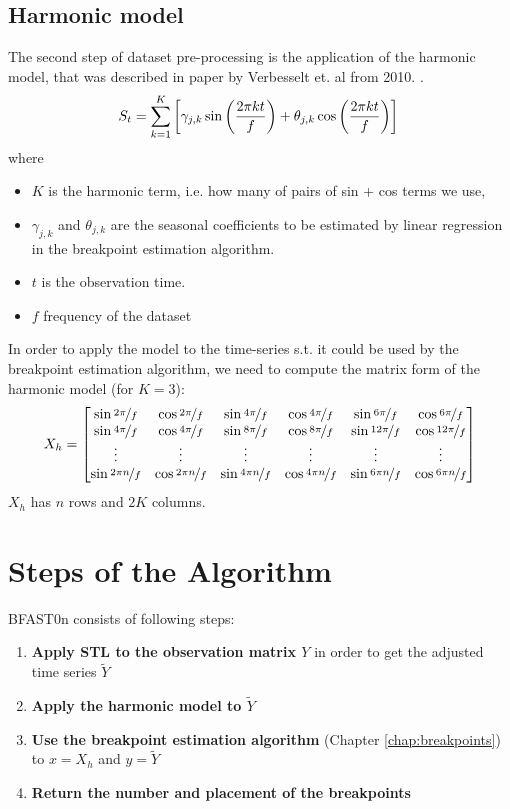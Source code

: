\documentclass[main.tex]{subfiles}
\begin{document}
\subsection{Harmonic model}
\label{subsec:harmonic_model}
The second step of dataset pre-processing is the application of the harmonic
model, that was described in paper by Verbesselt et. al from 2010.
\cite{bfast1}.
\[
S_{t} =
\sum_{k=1}^{K}\left[\gamma_{j, k} \sin \left(\frac{2 \pi k t}{f}\right)+
  \theta_{j, k} \cos \left(\frac{2 \pi k t}{f}\right)\right]\\
\]
where
\begin{itemize}
\item $K$ is the harmonic term, i.e. how many of pairs of sin + cos terms we use,
\item $\gamma_{j, k}$ and $\theta_{j, k}$ are the seasonal coefficients to be
  estimated by linear regression in the breakpoint estimation algorithm.
\item $t$ is the observation time.
\item $f$ frequency of the dataset
\end{itemize}
In order to apply the model to the time-series s.t. it could be used by the
breakpoint estimation algorithm, we need to compute the matrix form of the
harmonic model (for $K=3$):
\[
X_{h} =
\begin{bmatrix}
  \sin\nicefrac{2 \pi}{f} & \cos\nicefrac{2 \pi}{f} & \sin\nicefrac{4 \pi}{f} & \cos\nicefrac{4
    \pi}{f} &  \sin\nicefrac{6 \pi}{f} & \cos\nicefrac{6 \pi}{f} \\
  \sin\nicefrac{4 \pi}{f} & \cos\nicefrac{4 \pi}{f} & \sin\nicefrac{8 \pi}{f} & \cos\nicefrac{8
    \pi}{f} &  \sin\nicefrac{12 \pi}{f} & \cos\nicefrac{12 \pi}{f} \\
  \vdots & \vdots  & \vdots & \vdots & \vdots & \vdots \\
  \sin\nicefrac{2 \pi n}{f} & \cos\nicefrac{2 \pi n}{f} & \sin\nicefrac{4 \pi n}{f} &
  \cos\nicefrac{4 \pi n}{f} &  \sin\nicefrac{6 \pi n}{f} & \cos\nicefrac{6 \pi n}{f}
\end{bmatrix}
\]
$X_h$ has $n$ rows and $2K$ columns.

\section{Steps of the Algorithm}
\label{sec:bfast0n_algorithm_steps}
BFAST0n consists of following steps:
\begin{enumerate}
\item \textbf{Apply STL to the observation matrix $Y$} in order to get the adjusted
  time series $\tilde{Y}$
\item \textbf{Apply the harmonic model to $\tilde{Y}$}
\item \textbf{Use the breakpoint estimation algorithm} (Chapter \ref{chap:breakpoints})
  to $x=X_h$ and $y=\tilde{Y}$
\item \textbf{Return the number and placement of the breakpoints}
\end{enumerate}
\end{document}

